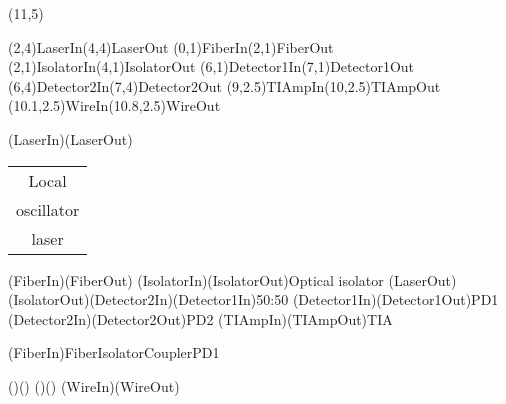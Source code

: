 \documentclass[pstricks]{standalone}
\begin{document}
	\begin{pspicture}(11,5)
		\begin{optexp}
			\pnodes(2,4){LaserIn}(4,4){LaserOut}
		  	\pnodes(0,1){FiberIn}(2,1){FiberOut}
		  	\pnodes(2,1){IsolatorIn}(4,1){IsolatorOut}
		  	\pnodes(6,1){Detector1In}(7,1){Detector1Out}
		  	\pnodes(6,4){Detector2In}(7,4){Detector2Out}
		  	\pnodes(9,2.5){TIAmpIn}(10,2.5){TIAmpOut}
		  	\pnodes(10.1,2.5){WireIn}(10.8,2.5){WireOut}

		  	\optbox[compname=Laser, position=start, optboxsize=2 1.4, labeloffset=0](LaserIn)(LaserOut){{\begin{tabular}{@{}c@{}}Local\\oscillator\\laser\end{tabular}}}
			\optfiber[compname=Fiber](FiberIn)(FiberOut)
			\optisolator[compname=Isolator](IsolatorIn)(IsolatorOut){Optical isolator}
			\optcoupler[compname=Coupler](LaserOut)(IsolatorOut)(Detector2In)(Detector1In){50:50}
			\optdetector[compname=PD1, dettype=diode, extnode=r](Detector1In)(Detector1Out){PD1}
			\optdetector[compname=PD2, dettype=diode, extnode=r](Detector2In)(Detector2Out){PD2}
		  	\optbox[compname=TIAmp, optboxsize=1.2 1, labeloffset=0, extnode=l](TIAmpIn)(TIAmpOut){TIA}
		
			\drawfiber(FiberIn){Fiber}{Isolator}{Coupler}{PD1}
			
			\drawwire[wireangleA=-54, wireangleB=-54]()()
			\drawwire[wireangleA=54, wireangleB=54]()()
			\drawwire[arrows=->](WireIn)(WireOut)
		\end{optexp}
	\end{pspicture}
\end{document}
